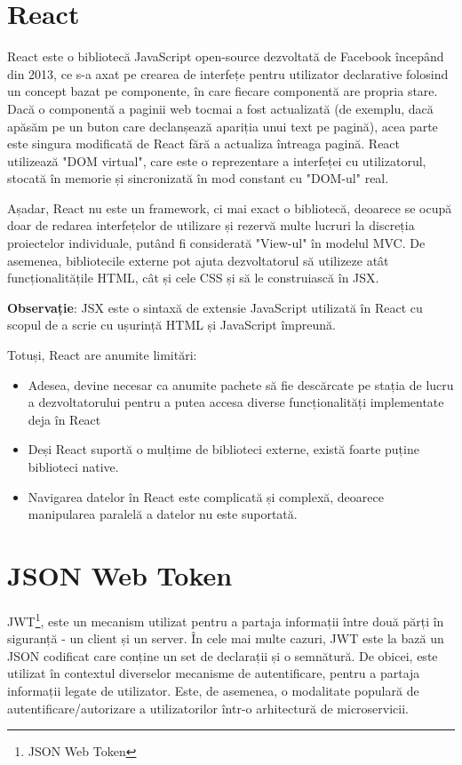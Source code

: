 \section{React}

React este o bibliotecă JavaScript open-source dezvoltată de Facebook începând din 2013, ce s-a axat pe crearea de interfețe pentru utilizator declarative folosind un concept bazat pe componente, în care fiecare componentă are propria stare.\newline
Dacă o componentă a paginii web tocmai a fost actualizată (de exemplu, dacă apăsăm pe un buton care declanșează apariția unui text pe pagină), acea parte este singura modificată de React fără a actualiza întreaga pagină. React utilizează "DOM virtual", care este o reprezentare a interfeței cu utilizatorul, stocată în memorie și sincronizată în mod constant cu "DOM-ul" real.\newline

Așadar, React nu este un framework, ci mai exact o bibliotecă, deoarece se ocupă doar de redarea interfețelor de utilizare și rezervă multe lucruri la discreția proiectelor individuale, putând fi considerată "View-ul" în modelul MVC. De asemenea, bibliotecile externe pot ajuta dezvoltatorul să utilizeze atât funcționalitățile HTML, cât și cele CSS și să le construiască în JSX.\newline

\textbf{Observație}: JSX este o sintaxă de extensie JavaScript utilizată în React cu scopul de a scrie cu ușurință HTML și JavaScript împreună.
\newline


Totuși, React are anumite limitări:

\begin{itemize}
	\item{Adesea, devine necesar ca anumite pachete să fie descărcate pe stația de lucru a dezvoltatorului pentru a putea accesa diverse funcționalități implementate deja în React}
	\item{Deși React suportă o mulțime de biblioteci externe, există foarte puține biblioteci native.}
	\item{Navigarea datelor în React este complicată și complexă, deoarece manipularea paralelă a datelor nu este suportată.}
	\newline
\end{itemize}

\section{JSON Web Token}
JWT\footnote{JSON Web Token}, este un mecanism utilizat pentru a partaja informații între două părți în siguranță - un client și un server. În cele mai multe cazuri, JWT este la bază un JSON codificat care conține un set de declarații și o semnătură. De obicei, este utilizat în contextul diverselor mecanisme de autentificare, pentru a partaja informații legate de utilizator. Este, de asemenea, o modalitate populară de autentificare/autorizare a utilizatorilor într-o arhitectură de microservicii.

